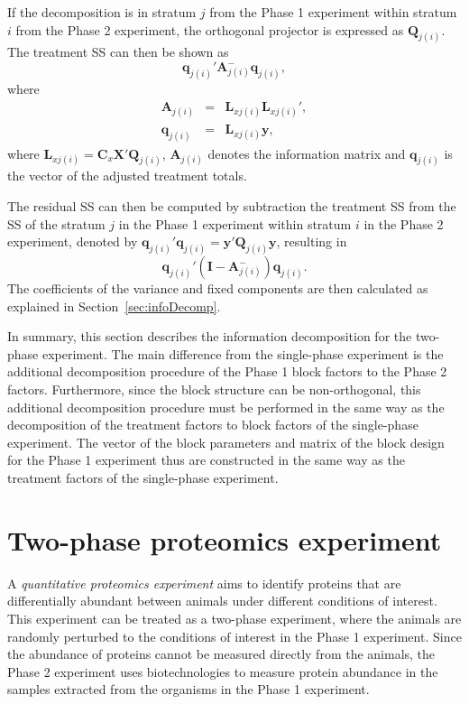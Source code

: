 \documentclass[article]{jss}
\newcommand{\I}{\mathbf{I}}
\newcommand{\X}{\mathbf{X}}
\newcommand{\Q}{\mathbf{Q}}
\newcommand{\A}{\mathbf{A}}
\newcommand{\C}{\mathbf{C}}
\newcommand{\mL}{\mathbf{L}}
\begin{document}
If the decomposition is in stratum $j$ from the Phase 1 experiment within stratum $i$ from the Phase 2 experiment, the orthogonal projector is expressed as $\Q_{j(i)}$. The treatment SS can then be shown as
\[
\bm{q}_{j(i)}' \A_{j(i)}^{-} \bm{q}_{j(i)},
\]
where
\begin{eqnarray*}
\A_{j(i)} &=& \mL_{xj(i)}\mL_{xj(i)}',\\
\bm{q}_{j(i)} &=& \mL_{xj(i)} \bm{y},
\end{eqnarray*}
where $\mL_{xj(i)} = \C_x \X' \Q_{j(i)}$, $\A_{j(i)}$ denotes the information matrix and $\bm{q}_{j(i)}$ is the vector of the adjusted treatment totals.

The residual SS can then be computed by subtraction the treatment SS from the SS of the stratum $j$ in the Phase 1 experiment within stratum $i$ in the Phase 2 experiment, denoted by $\bm{q}_{j(i)}'\bm{q}_{j(i)} = \bm{y}' \Q_{j(i)} \bm{y}$, resulting in
\[
\bm{q}_{j(i)}' (\I - \A_{j(i)}^{-}) \bm{q}_{j(i)}.
\]
The coefficients of the variance and fixed components are then calculated as explained in Section~\ref{sec:infoDecomp}.

In summary, this section describes the information decomposition for the two-phase experiment. The main difference from the single-phase experiment is the additional decomposition procedure of the Phase 1 block factors to the Phase 2 factors. Furthermore, since the block structure can be non-orthogonal, this additional decomposition procedure must be performed in the same way as the decomposition of the treatment factors to block factors of the single-phase experiment. The vector of the block parameters and matrix of the block design for the Phase 1 experiment thus are constructed in the same way as the treatment factors of the single-phase experiment.  

\section{Two-phase proteomics experiment} 
\label{sec:exampleTwoPase}
A \emph{quantitative proteomics experiment} aims to identify proteins that are differentially abundant between animals under different conditions of interest. This experiment can be treated as a two-phase experiment, where the animals are randomly perturbed to the conditions of interest in the Phase 1 experiment. Since the abundance of proteins cannot be measured directly from the animals, the Phase 2 experiment uses biotechnologies to measure protein abundance in the samples extracted from the organisms in the Phase 1 experiment. 
\end{document}
